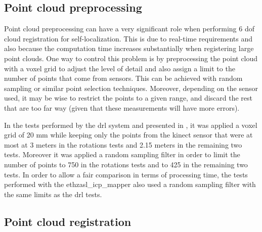 \subsection{Point cloud preprocessing}

Point cloud preprocessing can have a very significant role when performing 6 \gls{dof} cloud registration for self-localization. This is due to real-time requirements and also because the computation time increases substantially when registering large point clouds. One way to control this problem is by preprocessing the point cloud with a voxel grid to adjust the level of detail and also assign a limit to the number of points that come from sensors. This can be achieved with random sampling or similar point selection techniques. Moreover, depending on the sensor used, it may be wise to restrict the points to a given range, and discard the rest that are too far way (given that these measurements will have more errors).

In the tests performed by the \gls{drl} system and presented in , it was applied a voxel grid of 20 mm while keeping only the points from the kinect sensor that were at most at 3 meters in the rotations tests and 2.15 meters in the remaining two tests. Moreover it was applied a random sampling filter in order to limit the number of points to 750 in the rotations tests and to 425 in the remaining two tests. In order to allow a fair comparison in terms of processing time, the tests performed with the ethzasl\_icp\_mapper also used a random sampling filter with the same limits as the \gls{drl} tests.




\subsection{Point cloud registration}


